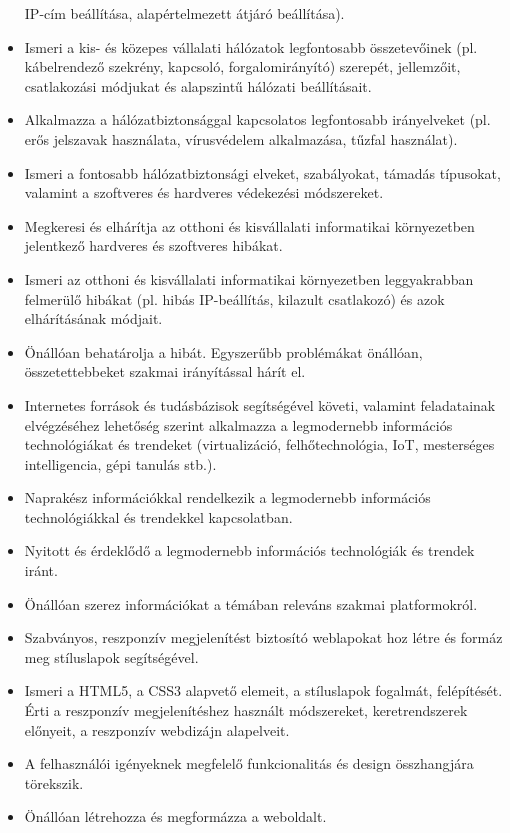 \begin{itemize}
  IP-cím beállítása, alapértelmezett átjáró beállítása).
\item
  Ismeri a kis- és közepes vállalati hálózatok legfontosabb
  összetevőinek (pl. kábelrendező szekrény, kapcsoló, forgalomirányító)
  szerepét, jellemzőit, csatlakozási módjukat és alapszintű hálózati
  beállításait.
\item
  Alkalmazza a hálózatbiztonsággal kapcsolatos legfontosabb irányelveket
  (pl. erős jelszavak használata, vírusvédelem alkalmazása, tűzfal
  használat).
\item
  Ismeri a fontosabb hálózatbiztonsági elveket, szabályokat, támadás
  típusokat, valamint a szoftveres és hardveres védekezési módszereket.
\item
  Megkeresi és elhárítja az otthoni és kisvállalati informatikai
  környezetben jelentkező hardveres és szoftveres hibákat.
\item
  Ismeri az otthoni és kisvállalati informatikai környezetben
  leggyakrabban felmerülő hibákat (pl. hibás IP-beállítás, kilazult
  csatlakozó) és azok elhárításának módjait.
\item
  Önállóan behatárolja a hibát. Egyszerűbb problémákat önállóan,
  összetettebbeket szakmai irányítással hárít el.
\item
  Internetes források és tudásbázisok segítségével követi, valamint
  feladatainak elvégzéséhez lehetőség szerint alkalmazza a legmodernebb
  információs technológiákat és trendeket (virtualizáció,
  felhőtechnológia, IoT, mesterséges intelligencia, gépi tanulás stb.).
\item
  Naprakész információkkal rendelkezik a legmodernebb információs
  technológiákkal és trendekkel kapcsolatban.
\item
  Nyitott és érdeklődő a legmodernebb információs technológiák és
  trendek iránt.
\item
  Önállóan szerez információkat a témában releváns szakmai
  platformokról.
\item
  Szabványos, reszponzív megjelenítést biztosító weblapokat hoz létre és
  formáz meg stíluslapok segítségével.
\item
  Ismeri a HTML5, a CSS3 alapvető elemeit, a stíluslapok fogalmát,
  felépítését. Érti a reszponzív megjelenítéshez használt módszereket,
  keretrendszerek előnyeit, a reszponzív webdizájn alapelveit.
\item
  A felhasználói igényeknek megfelelő funkcionalitás és design
  összhangjára törekszik.
\item
  Önállóan létrehozza és megformázza a weboldalt.

\end{itemize}

